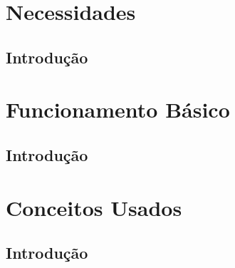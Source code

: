 \chapter{Necessidades}

\section{Introdução}

\chapter{Funcionamento Básico}

\section{Introdução}

\chapter{Conceitos Usados}

\section{Introdução}
